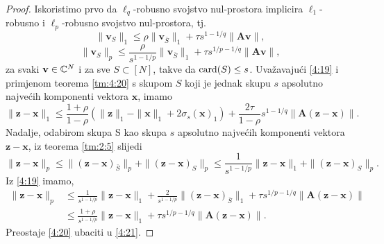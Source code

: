 \documentclass[a4paper,twoside,12pt]{memoir} %
\newcommand{\vect}[1]{\mathbf{#1}}
\renewcommand{\vec}{\vect}
\newcommand{\card}{\text{\normalfont{card}}}
\newcommand{\norm}[1]{\|{#1}\|}
\begin{document}
\begin{proof}
    Iskoristimo prvo da $\ell_q$-robusno svojstvo nul-prostora implicira $\ell_1$-robusno i $\ell_p$-robusno svojstvo nul-prostora, tj.
    \begin{equation}\label{4:18}
        \norm{\vec v_S}_1 \leq \rho \norm{\vec v_{\bar S}}_1 + \tau s^{1-1/q} \norm{\vec{Av}},
    \end{equation}
    \begin{equation}\label{4:19}
        \norm{\vec v_S}_p \leq \frac{\rho}{s^{1-1/p}} \norm{\vec v_{\bar S}}_1 + \tau s^{1/p - 1/q} \norm{\vec{Av}},
    \end{equation}
    za svaki $\vec v \in \C^N$ i za sve $S \subset [N]$, takve da $\card(S) \leq s$. Uva\v{z}avaju\'ci \eqref{4:19} i primjenom teorema \ref{tm:4:20} s skupom $S$ koji je jednak skupu $s$ apsolutno najve\'cih komponenti vektora $\vec x$, imamo
    \begin{equation}\label{4:20}
        \norm{\vec z - \vec x}_1 \leq \frac{1+\rho}{1-\rho}(\norm{\vec z }_1 - \norm{\vec x}_1 + 2 \sigma_s(\vec x)_1)+ \frac{2 \tau}{1 - \rho}s^{1-1/q} \norm{\vec A (\vec z - \vec x)}.
    \end{equation}
    Nadalje, odabirom skupa S kao skupa $s$ apsolutno najve\'cih komponenti vektora $\vec z - \vec x$, iz teorema \ref{tm:2:5} slijedi
    \begin{equation*}
        \norm{\vec z - \vec x}_p \leq \norm{(\vec z - \vec x)_{\bar S}}_p + \norm{(\vec z - \vec x)_S}_p \leq \frac{1}{s^{1-1/p}}\norm{\vec z - \vec x}_1 + \norm{(\vec z - \vec x)_S}_p.
    \end{equation*}
    Iz \eqref{4:19} imamo,
    \begin{align}\label{4:21}
        \norm{\vec z - \vec x}_p &\leq \frac{1}{s^{1-1/p}} \norm{\vec z - \vec x}_1 + \frac{2}{s^{1-1/p}} \norm{(\vec z - \vec x)_{\bar S}}_1 + \tau s^{1/p - 1/q} \norm{\vec A (\vec z - \vec x)}\nonumber \\
        &\leq  \frac{1+\rho}{s^{1-1/p}}  \norm{\vec z - \vec x}_1 + \tau s^{1/p - 1/q} \norm{ \vec A (\vec z - \vec x)}.
    \end{align}
    Preostaje \eqref{4:20} ubaciti u \eqref{4:21}.
\end{proof}
\end{document}
